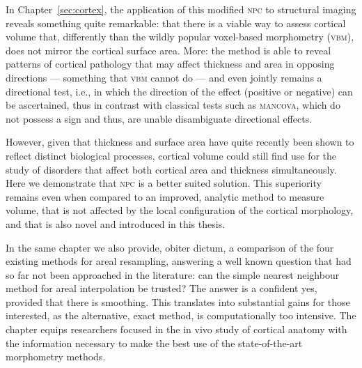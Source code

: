 In Chapter~\ref{sec:cortex}, the application of this modified \textsc{npc} to structural imaging reveals something quite remarkable: that there is a viable way to assess cortical volume that, differently than the wildly popular voxel-based morphometry (\textsc{vbm}), does not mirror the cortical surface area. More: the method is able to reveal patterns of cortical pathology that may affect thickness and area in opposing directions --- something that \textsc{vbm} cannot do --- and even jointly remains a directional test, i.e., in which the direction of the effect (positive or negative) can be ascertained, thus in contrast with classical tests such as \textsc{mancova}, which do not possess a sign and thus, are unable disambiguate directional effects.

However, given that thickness and surface area have quite recently been shown to reflect distinct biological processes, cortical volume could still find use for the study of disorders that affect both cortical area and thickness simultaneously. Here we demonstrate that \textsc{npc} is a better suited solution. This superiority remains even when compared to an improved, analytic method to measure volume, that is not affected by the local configuration of the cortical morphology, and that is also novel and introduced in this thesis.

In the same chapter we also provide, obiter dictum, a comparison of the four existing methods for areal resampling, answering a well known question that had so far not been approached in the literature: can the simple nearest neighbour method for areal interpolation be trusted? The answer is a confident yes, provided that there is smoothing. This translates into substantial gains for those interested, as the alternative, exact method, is computationally too intensive. The chapter equips researchers focused in the in vivo study of cortical anatomy with the information necessary to make the best use of the state-of-the-art morphometry methods.